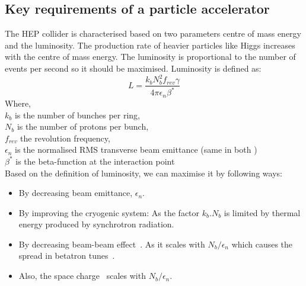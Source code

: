 \subsection{Key requirements of a particle accelerator} %
\label{sub:few_key_requirements}

The HEP collider is characterised based on two parameters centre of mass energy and the luminosity. The production rate of heavier particles like Higgs increases with the centre of mass energy. The luminosity is proportional to the number of events per second so it should be maximised. Luminosity is defined as:
\begin{equation}
    L = \frac{k_bN_b^2f_{rev}\gamma}{4 \pi \epsilon_n \beta^*}
\end{equation}
Where,\\
\hspace{2 cm}$k_b$ is the number of bunches per ring,\\
\hspace{2 cm}$N_b$ is the number of protons per bunch,\\
\hspace{2 cm}$f_{rev}$ the revolution frequency,\\
\hspace{2 cm}$\epsilon_n$ is the normalised RMS transverse beam emittance (same in both )\\
\hspace{2 cm}$\beta^*$ is the beta-function at the interaction point\\

Based on the definition of luminosity, we can maximise it by following ways:
\begin{itemize}
    \item By decreasing beam emittance, $\epsilon_n$.
    \item By improving the cryogenic system: As the factor $k_b.N_b$ is limited by thermal energy produced by synchrotron radiation.
    \item By decreasing beam-beam effect~\cite{Herr2014,Papotti2014}. As it scales with $N_b/ \epsilon_n$ which causes the spread in betatron tunes~\cite{Dubouchet2013}.
    \item Also, the space charge~\cite{Oeftiger2016} scales with $N_b/ \epsilon_n$.
\end{itemize}


